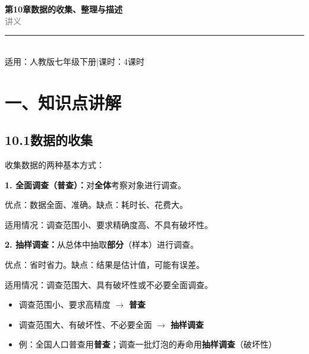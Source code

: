 \documentclass[12pt, a4paper]{ctexart}
\begin{document}
\begin{center}
{\Huge\bfseries\textcolor{mainblue}{第10章\quad 数据的收集、整理与描述}}\\[12pt]
{\Large\textcolor{gray}{讲\quad 义}}\\[8pt]
\rule{0.6\textwidth}{1pt}\\[8pt]
{\normalsize 适用：人教版\quad 七年级下册\quad |\quad 课时：4课时}
\end{center}
\vspace{10pt}

\section*{\textcolor{mainblue}{一、知识点讲解}}

\subsection*{10.1\quad 数据的收集}

\begin{knowledgebox}[10.1.1 调查方式]
收集数据的两种基本方式：

\textbf{1. 全面调查（普查）：}对\textbf{全体}考察对象进行调查。

优点：数据全面、准确。\quad 缺点：耗时长、花费大。

适用情况：调查范围小、要求精确度高、不具有破坏性。

\textbf{2. 抽样调查：}从总体中抽取\textbf{部分}（样本）进行调查。

优点：省时省力。\quad 缺点：结果是估计值，可能有误差。

适用情况：调查范围大、具有破坏性或不必要全面调查。
\end{knowledgebox}

\begin{tipbox}[如何选择调查方式]
\begin{itemize}[leftmargin=2em]
  \item 调查范围小、要求高精度 $\longrightarrow$ \textbf{普查}
  \item 调查范围大、有破坏性、不必要全面 $\longrightarrow$ \textbf{抽样调查}
  \item 例：全国人口普查用\textbf{普查}；调查一批灯泡的寿命用\textbf{抽样调查}（破坏性）
\end{itemize}
\end{tipbox}
\end{document}
